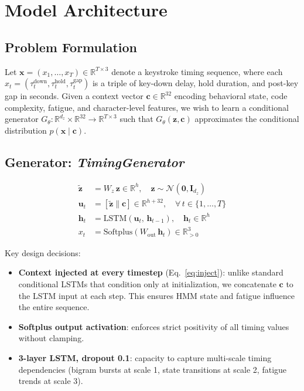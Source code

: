 \documentclass[sigconf,nonacm]{acmart}
\begin{document}
\section{Model Architecture}

\subsection{Problem Formulation}

Let $\mathbf{x} = (x_1, \ldots, x_T) \in \mathbb{R}^{T \times 3}$ denote a
keystroke timing sequence, where each $x_t = (\tau^\text{down}_t,
\tau^\text{hold}_t, \tau^\text{gap}_t)$ is a triple of key-down delay,
hold duration, and post-key gap in seconds.
Given a context vector $\mathbf{c} \in \mathbb{R}^{32}$ encoding behavioral
state, code complexity, fatigue, and character-level features, we wish to
learn a conditional generator $G_\theta: \mathbb{R}^{d_z} \times \mathbb{R}^{32}
\to \mathbb{R}^{T \times 3}$ such that $G_\theta(\mathbf{z}, \mathbf{c})$
approximates the conditional distribution $p(\mathbf{x} \mid \mathbf{c})$.

\subsection{Generator: \textit{TimingGenerator}}

\begin{align}
\tilde{\mathbf{z}} &= W_z\,\mathbf{z} \in \mathbb{R}^{h},
  \quad \mathbf{z} \sim \mathcal{N}(\mathbf{0}, \mathbf{I}_{d_z}) \label{eq:proj} \\
\mathbf{u}_t &= [\tilde{\mathbf{z}} \| \mathbf{c}] \in \mathbb{R}^{h+32},
  \quad \forall\,t \in \{1,\ldots,T\} \label{eq:inject} \\
\mathbf{h}_t &= \mathrm{LSTM}(\mathbf{u}_t,\, \mathbf{h}_{t-1}),
  \quad \mathbf{h}_t \in \mathbb{R}^h \label{eq:lstm} \\
x_t &= \mathrm{Softplus}(W_\text{out}\,\mathbf{h}_t) \in \mathbb{R}^3_{>0}
  \label{eq:out}
\end{align}

Key design decisions:
\begin{itemize}
  \item \textbf{Context injected at every timestep} (Eq.~\ref{eq:inject}):
    unlike standard conditional LSTMs that condition only at initialization,
    we concatenate $\mathbf{c}$ to the LSTM input at each step.
    This ensures HMM state and fatigue influence the entire sequence.
  \item \textbf{Softplus output activation}: enforces strict positivity
    of all timing values without clamping.
  \item \textbf{3-layer LSTM, dropout 0.1}: capacity to capture multi-scale
    timing dependencies (bigram bursts at scale 1, state transitions at
    scale 2, fatigue trends at scale 3).
\end{itemize}
\end{document}
